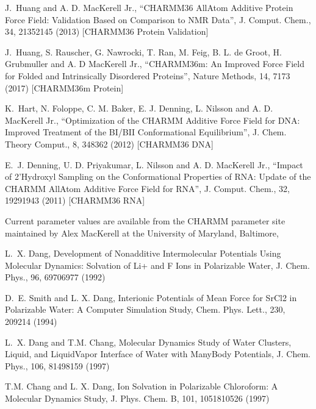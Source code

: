 \documentclass[letterpaper,11pt,english]{sphinxmanual}
\begin{document}
\sphinxAtStartPar
J. Huang and A. D. MacKerell Jr., “CHARMM36 All\sphinxhyphen{}Atom Additive Protein Force Field: Validation Based on Comparison to NMR Data”, J. Comput. Chem., 34, 2135\sphinxhyphen{}2145 (2013)  {[}CHARMM36 Protein Validation{]}

\sphinxAtStartPar
J. Huang, S. Rauscher, G. Nawrocki, T. Ran, M. Feig, B. L. de Groot, H. Grubmuller and A. D MacKerell Jr., “CHARMM36m: An Improved Force Field for Folded and Intrinsically Disordered Proteins”, Nature Methods, 14, 71\sphinxhyphen{}73 (2017)  {[}CHARMM36m Protein{]}

\sphinxAtStartPar
K. Hart, N. Foloppe, C. M. Baker, E. J. Denning, L. Nilsson and A. D. MacKerell Jr., “Optimization of the CHARMM Additive Force Field for DNA: Improved Treatment of the BI/BII Conformational Equilibrium”, J. Chem. Theory Comput., 8, 348\sphinxhyphen{}362 (2012)  {[}CHARMM36 DNA{]}

\sphinxAtStartPar
E. J. Denning, U. D. Priyakumar, L. Nilsson and A. D. MacKerell Jr., “Impact of 2’\sphinxhyphen{}Hydroxyl Sampling on the Conformational Properties of RNA: Update of the CHARMM All\sphinxhyphen{}Atom Additive Force Field for RNA”, J. Comput. Chem., 32, 1929\sphinxhyphen{}1943 (2011)  {[}CHARMM36 RNA{]}

\sphinxAtStartPar
Current parameter values are available from the CHARMM parameter site maintained by Alex MacKerell at the University of Maryland, Baltimore, 

\sphinxAtStartPar
{}

\sphinxAtStartPar
L. X. Dang,  Development of Nonadditive Intermolecular Potentials Using Molecular Dynamics: Solvation of Li+ and F\sphinxhyphen{} Ions in Polarizable Water, J. Chem. Phys., 96, 6970\sphinxhyphen{}6977 (1992)

\sphinxAtStartPar
D. E. Smith and L. X. Dang, Interionic Potentials of Mean Force for SrCl2 in Polarizable Water: A Computer Simulation Study, Chem. Phys. Lett., 230, 209\sphinxhyphen{}214 (1994)

\sphinxAtStartPar
L. X. Dang and T.\sphinxhyphen{}M. Chang, Molecular Dynamics Study of Water Clusters, Liquid, and Liquid\sphinxhyphen{}Vapor Interface of Water with Many\sphinxhyphen{}Body Potentials, J. Chem. Phys., 106, 8149\sphinxhyphen{}8159 (1997)

\sphinxAtStartPar
T.\sphinxhyphen{}M. Chang and L. X. Dang, Ion Solvation in Polarizable Chloroform: A Molecular Dynamics Study, J. Phys. Chem. B, 101, 10518\sphinxhyphen{}10526 (1997)
\end{document}
